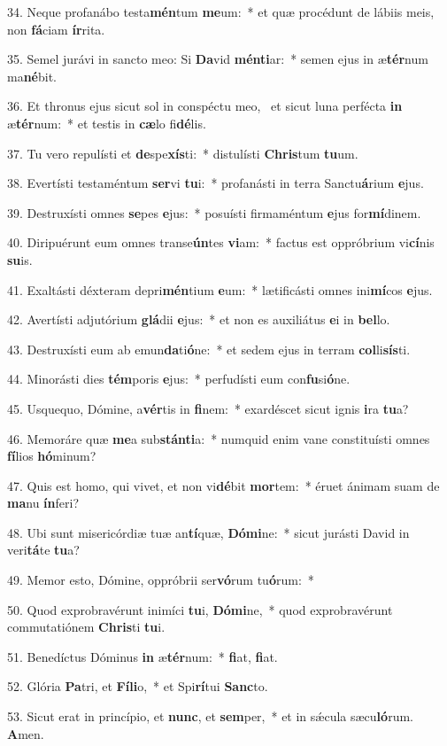 34. Neque profanábo testa\textbf{mén}tum \textbf{me}um:~*  et quæ procédunt de lábiis meis, non \textbf{fá}ciam \textbf{ír}rita.\

35. Semel jurávi in sancto meo: Si \textbf{Da}vid \textbf{mén}\textbf{ti}ar:~*  semen ejus in æ\textbf{tér}num ma\textbf{né}bit.\

36. Et thronus ejus sicut sol in conspéctu meo, \dag\  et sicut luna perfécta \textbf{in} æ\textbf{tér}num:~*  et testis in \textbf{cæ}lo fi\textbf{dé}lis.\

37. Tu vero repulísti et \textbf{de}spe\textbf{xís}ti:~*  distulísti \textbf{Chris}tum \textbf{tu}um.\

38. Evertísti testaméntum \textbf{ser}vi \textbf{tu}i:~*  profanásti in terra Sanctu\textbf{á}rium \textbf{e}jus.\

39. Destruxísti omnes \textbf{se}pes \textbf{e}jus:~*  posuísti firmaméntum \textbf{e}jus for\textbf{mí}dinem.\

40. Diripuérunt eum omnes transe\textbf{ún}tes \textbf{vi}am:~*  factus est oppróbrium vi\textbf{cí}nis \textbf{su}is.\

41. Exaltásti déxteram depri\textbf{mén}tium \textbf{e}um:~*  lætificásti omnes ini\textbf{mí}cos \textbf{e}jus.\

42. Avertísti adjutórium \textbf{glá}dii \textbf{e}jus:~*  et non es auxiliátus \textbf{e}i in \textbf{bel}lo.\

43. Destruxísti eum ab emun\textbf{da}ti\textbf{ó}ne:~*  et sedem ejus in terram \textbf{col}li\textbf{sís}ti.\

44. Minorásti dies \textbf{tém}poris \textbf{e}jus:~*  perfudísti eum con\textbf{fu}si\textbf{ó}ne.\

45. Usquequo, Dómine, a\textbf{vér}tis in \textbf{fi}nem:~*  exardéscet sicut ignis \textbf{i}ra \textbf{tu}a?\

46. Memoráre quæ \textbf{me}a sub\textbf{stán}\textbf{ti}a:~*  numquid enim vane constituísti omnes \textbf{fí}lios \textbf{hó}minum?\

47. Quis est homo, qui vivet, et non vi\textbf{dé}bit \textbf{mor}tem:~*  éruet ánimam suam de \textbf{ma}nu \textbf{ín}feri?\

48. Ubi sunt misericórdiæ tuæ an\textbf{tí}quæ, \textbf{Dó}\textbf{mi}ne:~*  sicut jurásti David in veri\textbf{tá}te \textbf{tu}a?\

49. Memor esto, Dómine, oppróbrii ser\textbf{vó}rum tu\textbf{ó}rum:~*  \

50. Quod exprobravérunt inimíci \textbf{tu}i, \textbf{Dó}\textbf{mi}ne,~*  quod exprobravérunt commutatiónem \textbf{Chris}ti \textbf{tu}i.\

51. Benedíctus Dóminus \textbf{in} æ\textbf{tér}num:~*  \textbf{fi}at, \textbf{fi}at.\

52. Glória \textbf{Pa}tri, et \textbf{Fí}\textbf{li}o,~*  et Spi\textbf{rí}tui \textbf{Sanc}to.\

53. Sicut erat in princípio, et \textbf{nunc}, et \textbf{sem}per,~*  et in sǽcula sæcu\textbf{ló}rum. \textbf{A}men.\

